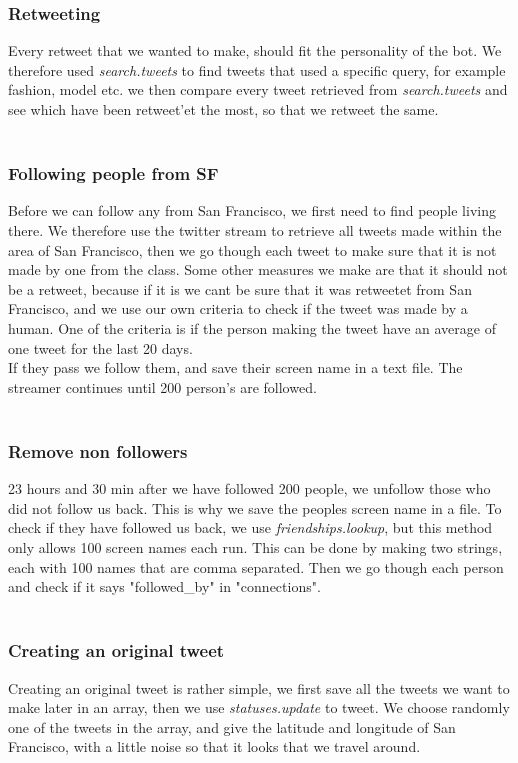 \subsubsection{Retweeting}
Every retweet that we wanted to make, should fit the personality of the bot. We therefore used \textit{search.tweets} to find tweets that used a specific query, for example fashion, model etc. we then compare every tweet retrieved from \textit{search.tweets} and see which have been retweet'et the most, so that we retweet the same.\\
\\

\subsubsection{Following people from SF}
Before we can follow any from San Francisco, we first need to find people living there. We therefore use the twitter stream to retrieve all tweets made within the area of San Francisco, then we go though each tweet to make sure that it is not made by one from the class. Some other measures we make are that it should not be a retweet, because if it is we cant be sure that it was retweetet from San Francisco, and we use our own criteria to check if the tweet was made by a human. One of the criteria is if the person making the tweet have an average of one tweet for the last 20 days.\\ 
If they pass we follow them, and save their screen name in a text file. The streamer continues until 200 person's are followed.\\
\\

\subsubsection{Remove non followers}
23 hours and 30 min after we have followed 200 people, we unfollow those who did not follow us back. This is why we save the peoples screen name in a file. To check if they have followed us back, we use \textit{friendships.lookup}, but this method only allows 100 screen names each run. This can be done by making two strings, each with 100 names that are comma separated. Then we go though each person and check if it says "followed\_by" in "connections".\\
\\

\subsubsection{Creating an original tweet}
Creating an original tweet is rather simple, we first save all the tweets we want to make later in an array, then we use \textit{statuses.update} to tweet. We choose randomly one of the tweets in the array, and give the latitude and longitude of San Francisco, with a little noise so that it looks that we travel around.\\
\\

